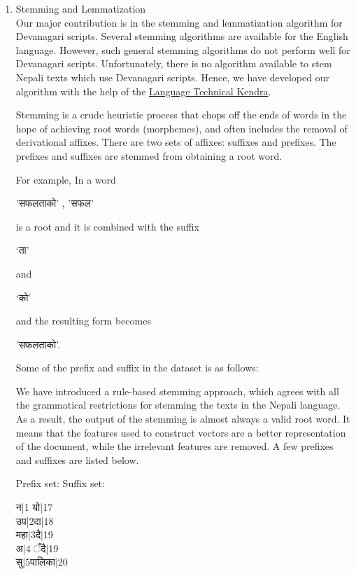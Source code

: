 \documentclass[conference]{IEEEtran}
\begin{document}
\begin{enumerate}
\renewcommand{\labelenumii}{\roman{enumii}}
\item Stemming and Lemmatization\\
Our major contribution is in the stemming and lemmatization algorithm for
Devanagari scripts. Several stemming algorithms are available for the English
language. However, such general stemming algorithms do not perform well for
Devanagari scripts. Unfortunately, there is no algorithm available to stem
Nepali texts which use Devanagari scripts.
Hence, we have developed our algorithm with the help of the 
\href{http://ltk.org.np/}{Language Technical Kendra}.
\medskip

Stemming is a crude heuristic process that chops off the ends of words in the hope of 
achieving root words (morphemes), and often includes the removal of
derivational affixes.
There are two sets of affixes: suffixes and prefixes. The prefixes and suffixes
are stemmed from obtaining a root word.
\medskip

For example, 
In a word \begin{sanskrit} 'सफलताको' 
, 'सफल' \end{sanskrit} is a root and it is combined with the suffix
\begin{sanskrit}‘ता’\end{sanskrit}  and \begin{sanskrit}‘को’\end{sanskrit} and the
resulting form becomes \begin{sanskrit} 'सफलताको'. \end{sanskrit}Some of the prefix
and suffix in the dataset is as follows:
\medskip

We have introduced a rule-based stemming approach, which
agrees with all the grammatical restrictions for stemming the texts in the Nepali language. As a result, the output of the stemming is almost always a
valid root word. It means that the features used to construct vectors are a better representation of the document, while the irrelevant features are removed. A few
prefixes and suffixes are listed below.

Prefix set: \qquad Suffix set:\\
\begin{sanskrit}
न|1\hspace{52pt} यो|17\\
उप|2\hspace{50pt}दा|18\\
महा|3\hspace{48pt}दै|19\\
अ|4\hspace{50pt} ँदै|19\\
सु|5\hspace{54pt}पालिका|20\\
\end{sanskrit}


\end{enumerate}
\end{document}
